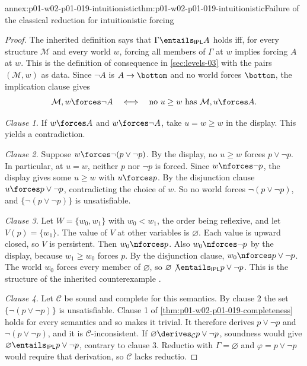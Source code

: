 \begin{annexitem}{annex:p01-w02-p01-019-intuitionistic}{thm:p01-w02-p01-019-intuitionistic}{Failure of the classical reduction for intuitionistic forcing}
\begin{proof}
The inherited definition says that \(\Gamma\entails_{\mathsf{IPL}}A\) holds iff,
for every structure \(\mathcal M\) and every world \(w\), forcing all members
of \(\Gamma\) at \(w\) implies forcing \(A\) at \(w\). This is the definition
of consequence in \cref{sec:levels-03} with the pairs \((\mathcal M,w)\) as
data. Since \(\neg A\) is \(A\to\bottom\) and no world forces \(\bottom\), the
implication clause gives
\[
  \mathcal M,w\forces\neg A
  \quad\Longleftrightarrow\quad
  \text{no } u\geq w \text{ has } \mathcal M,u\forces A .
\]

\emph{Clause 1.} If \(w\forces A\) and \(w\forces\neg A\), take \(u=w\geq w\)
in the display. This yields a contradiction.

\emph{Clause 2.} Suppose \(w\forces\neg(p\lor\neg p)\). By the display, no
\(u\geq w\) forces \(p\lor\neg p\). In particular, at \(u=w\), neither \(p\)
nor \(\neg p\) is forced. Since \(w\nforces\neg p\), the display gives some
\(u\geq w\) with \(u\forces p\). By the disjunction clause
\(u\forces p\lor\neg p\), contradicting the choice of \(w\). So no world
forces \(\neg(p\lor\neg p)\), and \(\{\neg(p\lor\neg p)\}\) is unsatisfiable.

\emph{Clause 3.} Let \(W=\{w_0,w_1\}\) with \(w_0<w_1\), the order being
reflexive, and let \(V(p)=\{w_1\}\). The value of \(V\) at other variables is
\(\varnothing\). Each value is upward closed, so \(V\) is persistent. Then
\(w_0\nforces p\). Also \(w_0\nforces\neg p\) by the display, because
\(w_1\geq w_0\) forces \(p\). By the disjunction clause,
\(w_0\nforces p\lor\neg p\). The world \(w_0\) forces every member of
\(\varnothing\), so \(\varnothing\not\entails_{\mathsf{IPL}}p\lor\neg p\).
This is the structure of the inherited counterexample
\cite[ch.~``Intuitionistic Logic'', example ``Counterexample structure and
world'']{FrozenFormalLogicConsistencyComparison}.

\emph{Clause 4.} Let \(\mathcal C\) be sound and complete for this semantics.
By clause 2 the set \(\{\neg(p\lor\neg p)\}\) is unsatisfiable. Clause 1 of
\cref{thm:p01-w02-p01-019-completeness} holds for every semantics and so
makes it trivial. It therefore derives \(p\lor\neg p\) and
\(\neg(p\lor\neg p)\), and it is \(\mathcal C\)-inconsistent. If
\(\varnothing\derives_{\mathcal C}p\lor\neg p\), soundness would give
\(\varnothing\entails_{\mathsf{IPL}}p\lor\neg p\), contrary to clause 3.
Reductio with \(\Gamma=\varnothing\) and \(\varphi=p\lor\neg p\) would
require that derivation, so \(\mathcal C\) lacks reductio.
\end{proof}
\end{annexitem}
